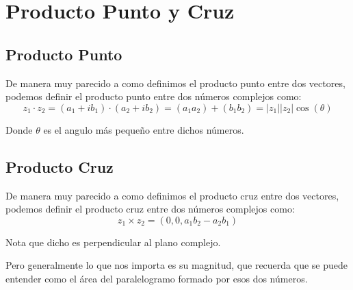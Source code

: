 \documentclass[12pt, fleqn]{report}                             %
\newcommand \Quote {\qq}                                        %
\newcommand{\Wrap}[1]{\left( #1 \right)}                        %
\newcommand{\Cos}[1]{\cos\Wrap{#1}}                             %
\begin{document}
        \clearpage
        \section{Producto Punto y Cruz}



            \subsection{Producto Punto}

                De manera muy parecido a como definimos el producto punto entre dos
                vectores, podemos definir el producto punto entre dos números complejos
                como:
                \begin{equation}
                    z_1 \cdot z_2
                        = (a_1 + ib_1) \cdot (a_2 + ib_2)
                        = (a_1 a_2) + (b_1 b_2)
                        = |z_1||z_2| \Cos{\theta}
                \end{equation}

                Donde $\theta$ es el angulo más pequeño entre dichos números.


            \subsection{Producto Cruz}

                De manera muy parecido a como definimos el producto cruz entre dos
                vectores, podemos definir el producto cruz entre dos números complejos
                como:
                \begin{equation}
                    z_1 \times z_2 = (0, 0, a_1 b_2 - a_2 b_1)
                \end{equation}

                Nota que dicho \Quote{vector} es perpendicular al plano complejo.

                Pero generalmente lo que nos importa es su magnitud, que recuerda
                que se puede entender como el área del paralelogramo formado por
                esos dos números.
\end{document}
